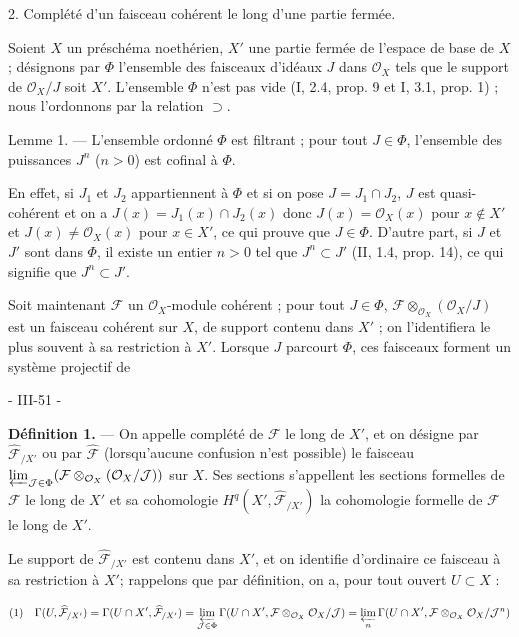 2. Complété d'un faisceau cohérent le long d'une partie fermée.

Soient $X$ un préschéma noethérien, $X'$ une partie fermée de l'espace de base de $X$ ; désignons par $\Phi$ l'ensemble des faisceaux d'idéaux $J$ dans $\mathcal{O}_X$ tels que le support de $\mathcal{O}_X/J$ soit $X'$. L'ensemble $\Phi$ n'est pas vide (I, 2.4, prop. 9 et I, 3.1, prop. 1) ; nous l'ordonnons par la relation $\supset$.

Lemme 1. — L'ensemble ordonné $\Phi$ est filtrant ; pour tout $J \in \Phi$, l'ensemble des puissances $J^n$ ($n > 0$) est cofinal à $\Phi$.

En effet, si $J_1$ et $J_2$ appartiennent à $\Phi$ et si on pose $J = J_1 \cap J_2$, $J$ est quasi-cohérent et on a $J(x) = J_1(x) \cap J_2(x)$ donc $J(x) = \mathcal{O}_X(x)$ pour $x \notin X'$ et $J(x) \neq \mathcal{O}_X(x)$ pour $x \in X'$, ce qui prouve que $J \in \Phi$. D'autre part, si $J$ et $J'$ sont dans $\Phi$, il existe un entier $n > 0$ tel que $J^n \subset J'$ (II, 1.4, prop. 14), ce qui signifie que $J^n \subset J'$.

Soit maintenant $\mathcal{F}$ un $\mathcal{O}_X$-module cohérent ; pour tout $J \in \Phi$, $\mathcal{F} \otimes_{\mathcal{O}_X} (\mathcal{O}_X/J)$ est un faisceau cohérent sur $X$, de support contenu dans $X'$ ; on l'identifiera le plus souvent à sa restriction à $X'$. Lorsque $J$ parcourt $\Phi$, ces faisceaux forment un système projectif de

\newpage


- III-51 -

\textbf{Définition 1.} — On appelle complété de $\mathcal{F}$ le long de $X'$, et on désigne par $\widehat{\mathcal{F}}_{/X'}$ ou par $\widehat{\mathcal{F}}$ (lorsqu'aucune confusion n'est possible) le faisceau $\varprojlim_{\mathcal{J} \in \Phi} (\mathcal{F} \otimes_{\mathcal{O}_X} (\mathcal{O}_X/\mathcal{J}))$ sur $X$. Ses sections s'appellent les sections formelles de $\mathcal{F}$ le long de $X'$ et sa cohomologie $H^q(X', \widehat{\mathcal{F}}_{/X'})$ la cohomologie formelle de $\mathcal{F}$ le long de $X'$.

Le support de $\widehat{\mathcal{F}}_{/X'}$ est contenu dans $X'$, et on identifie d'ordinaire ce faisceau à sa restriction à $X'$; rappelons que par définition, on a, pour tout ouvert $U \subset X$ :

$$(1) \quad \Gamma(U, \widehat{\mathcal{F}}_{/X'}) = \Gamma(U \cap X', \widehat{\mathcal{F}}_{/X'}) = \varprojlim_{\mathcal{J} \in \Phi} \Gamma(U \cap X', \mathcal{F} \otimes_{\mathcal{O}_X} \mathcal{O}_X/\mathcal{J}) = \varprojlim_{n} \Gamma(U \cap X', \mathcal{F} \otimes_{\mathcal{O}_X} \mathcal{O}_X/\mathcal{J}^n)$$

